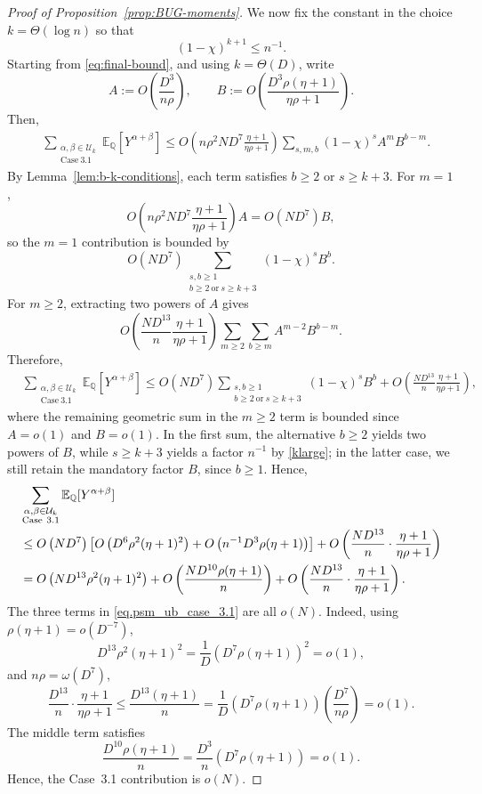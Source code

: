\documentclass[11pt, letterpaper]{article}
\numberwithin{equation}{section}
\newcommand{\E}{\mathbb{E}}
\begin{document}
\begin{proof}[Proof of Proposition~\ref{prop:BUG-moments}]
We now fix the constant in the choice $k=\Theta(\log n)$ so that
\begin{equation}\label{klarge}
    (1-\chi)^{k+1}\leq n^{-1}.
\end{equation}
Starting from \eqref{eq:final-bound}, and using $k=\Theta(D)$, write
\[
A:=O\left(\frac{D^3}{n\rho}\right),
\qquad
B:=O\left(\frac{D^3\rho(\eta+1)}{\eta\rho+1}\right).
\]
Then,
\begin{align*}
&\sum_{\substack{\alpha,\beta\in\mathcal U_k\\ \mathrm{Case\ 3.1}}}
\E_{\mathbb Q}[Y^{\alpha+\beta}]\le
O\left(n\rho^2ND^7\frac{\eta+1}{\eta\rho+1}\right)
\sum_{s,m,b}(1-\chi)^s A^m B^{b-m}.
\end{align*}
By Lemma~\ref{lem:b-k-conditions}, each term satisfies $b\ge2$ or $s\ge k+3$. For $m=1$,
\[
O\left(n\rho^2ND^7\frac{\eta+1}{\eta\rho+1}\right)A
=
O(ND^7)B,
\]
so the $m=1$ contribution is bounded by
\[
O(ND^7)
\sum_{\substack{s,b\ge1\\ b\ge2\ \mathrm{or}\ s\ge k+3}}
(1-\chi)^sB^b .
\]
For $m\ge2$, extracting two powers of $A$ gives
\[
O\left(\frac{ND^{13}}{n}\frac{\eta+1}{\eta\rho+1}\right)
\sum_{m\ge2}\sum_{b\ge m} A^{m-2}B^{b-m}.
\]
Therefore,
\begin{align*}
&\sum_{\substack{\alpha,\beta\in\mathcal U_k\\ \mathrm{Case\ 3.1}}}
\E_{\mathbb Q}[Y^{\alpha+\beta}]\le
O(ND^7)
\sum_{\substack{s,b\ge1\\ b\ge2\ \mathrm{or}\ s\ge k+3}}
(1-\chi)^sB^b
+
O\left(\frac{ND^{13}}{n}\frac{\eta+1}{\eta\rho+1}\right),
\end{align*}
where the remaining geometric sum in the $m\ge2$ term is bounded since $A=o(1)$ and $B=o(1)$. In the first sum, the alternative $b\ge2$ yields two powers of $B$, while $s\ge k+3$ yields a factor $n^{-1}$ by \eqref{klarge}; in the latter case, we still retain the mandatory factor $B$, since $b\ge1$. Hence,
\begin{align}
\notag &\sum_{\substack{\alpha,\beta\in\mathcal U_k\\ \mathrm{Case\ 3.1}}}
\E_{\mathbb Q}[Y^{\alpha+\beta}]\\
&\notag \le
O \left(ND^{7}\right)
\left[
O \left(D^6\rho^2(\eta+1)^2\right)
+
O \left(n^{-1}D^3\rho(\eta+1)\right)
\right]+
O\left(\frac{ND^{13}}{n}\cdot \frac{\eta+1}{\eta\rho+1}\right)\\
&=
O \left(ND^{13}\rho^2(\eta+1)^2\right)
+
O \left(\frac{ND^{10}\rho(\eta+1)}{n}\right)
+
O\left(\frac{ND^{13}}{n}\cdot \frac{\eta+1}{\eta\rho+1}\right).\label{eq.psm_ub_case_3.1}
\end{align}
The three terms in \eqref{eq.psm_ub_case_3.1} are all $o(N)$. Indeed, using $\rho(\eta+1)=o(D^{-7})$,
\[D^{13}\rho^2(\eta+1)^2=\frac{1}{D} \left(D^7\rho(\eta+1)\right)^2=o(1),
\]
and $n\rho=\omega(D^7)$,
\[\frac{D^{13}}{n}\cdot \frac{\eta+1}{\eta\rho+1}\le
\frac{D^{13}(\eta+1)}{n}=\frac{1}{D}\left(D^7\rho(\eta+1)\right)\left(\frac{D^{7}}{n\rho}\right)=o(1).
\]
The middle term satisfies
\[
\frac{D^{10}\rho(\eta+1)}{n}=\frac{D^3}{n}\left(D^7\rho(\eta+1)\right)=o(1).
\]
Hence, the Case~3.1 contribution is $o(N)$.


\end{proof}
\end{document}
